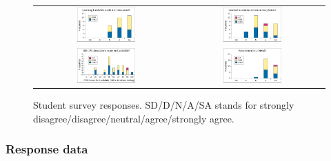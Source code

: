 \begin{figure}[p]
\begin{center}
\begin{tabular}{cc}
			\includegraphics[width=0.42\textwidth]{survey7.pdf} &
			\includegraphics[width=0.42\textwidth]{survey8.pdf} \\
			\includegraphics[width=0.42\textwidth]{survey9.pdf} &
			\includegraphics[width=0.42\textwidth]{survey10.pdf} \\
		\end{tabular}
	\end{center}
	\caption{Student survey responses.
	SD/D/N/A/SA stands for
	strongly disagree/\allowbreak{}disagree/\allowbreak{}neutral/\allowbreak{}agree/\allowbreak{}strongly agree.}
	\label{fig:survey}
\end{figure}

\subsubsection{Response data}
\label{sec:education-survey-response-data}

